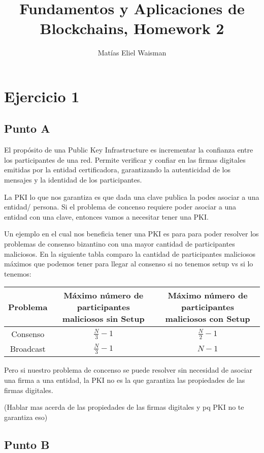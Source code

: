 \documentclass[12pt]{article}
\title{\fontsize{16}{18}\selectfont Fundamentos y Aplicaciones de Blockchains, Homework 2}
\author{Matías Eliel Waisman}
\date{}
\begin{document}
\maketitle

\section*{Ejercicio 1}

\subsection*{Punto A}

El propósito de una Public Key Infrastructure es incrementar la confianza entre los participantes de una red. Permite verificar y confiar en las firmas digitales emitidas por la entidad certificadora, garantizando la autenticidad de los mensajes y la identidad de los participantes.  

La PKI lo que nos garantiza es que dada una clave publica la podes asociar a una entidad/ persona. Si el problema de concenso requiere poder asociar a una entidad con una clave, entonces vamos a necesitar tener una PKI. 

Un ejemplo en el cual nos beneficia tener una PKI es para para poder resolver los problemas de consenso bizantino con una mayor cantidad de participantes maliciosos. En la siguiente tabla comparo la cantidad de participantes maliciosos máximos que podemos tener para llegar al consenso si no tenemos setup vs si lo tenemos:

\begin{center}
\begin{tabular}{|c|c|c|}
\hline
Problema & Máximo número de participantes maliciosos sin Setup & Máximo número de participantes maliciosos con Setup \\
\hline
Consenso & $\frac{N}{3} - 1$ & $\frac{N}{2} - 1$ \\
Broadcast & $\frac{N}{3} - 1$ & $N - 1$ \\
\hline
\end{tabular}
\end{center}

Pero si nuestro problema de concenso se puede resolver sin necesidad de asociar una firma a una entidad, la PKI no es la que garantiza las propiedades de las firmas digitales. 

(Hablar mas acerda de las propiedades de las firmas digitales y pq PKI no te garantiza eso)
\subsection*{Punto B}
\end{document}
